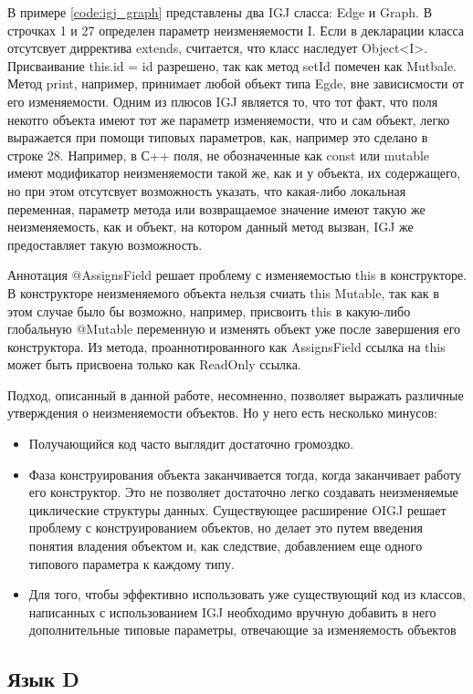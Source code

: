 В примере \ref{code:igj_graph} представлены два IGJ сласса: Edge и Graph. В строчках 1 и 27 определен параметр неизменяемости I. Если в декларации класса отсутсвует дирректива extends, считается, что класс наследует Object<I>. Присваивание this.id = id разрешено, так как метод setId помечен как Mutbale. Метод print, например, принимает любой объект типа Egde, вне зависисмости от его изменяемости. Одним из плюсов IGJ является то, что тот факт, что поля некотго объекта имеют тот же параметр изменяемости, что и сам объект, легко выражается при помощи типовых параметров, как, например это сделано в строке 28. Например, в С++ поля, не обозначенные как const или mutable имеют модификатор неизменяемости такой же, как и у объекта, их содержащего, но при этом отсутсвует возможность указать, что какая-либо локальная переменная, параметр метода или возвращаемое значение имеют такую же неизменяемость, как и объект, на котором данный метод вызван, IGJ же предоставляет такую возможность.

Аннотация @AssignsField решает проблему с изменяемостью this в конструкторе. В конструкторе неизменяемого объекта нельзя счиать this Mutable, так как в этом случае было бы возможно, например, присвоить this в какую-либо глобальную @Mutable переменную и изменять объект уже после завершения его конструктора. Из метода, проаннотированного как AssignsField ссылка на this может быть присвоена только как ReadOnly ссылка. 

Подход, описанный в данной работе, несомненно, позволяет выражать различные утверждения о неизменяемости объектов. Но у него есть несколько минусов:
\begin{itemize}
\item Получающийся код часто выглядит достаточно громоздко.
\item Фаза конструирования объекта заканчивается тогда, когда заканчивает работу его конструктор. Это не позволяет достаточно легко создавать неизменяемые циклические структуры данных. Существующее расширение OIGJ \cite{Potanin} решает проблему с конструированием объектов, но делает это путем введения понятия владения объектом и, как следствие, добавлением еще одного типового параметра к каждому типу. 
\item Для того, чтобы эффективно использовать уже существующий код из классов, написанных с использованием IGJ необходимо вручную добавить в него дополнительные типовые параметры, отвечающие за изменяемость объектов
\end{itemize}

\subsection{Язык D}

